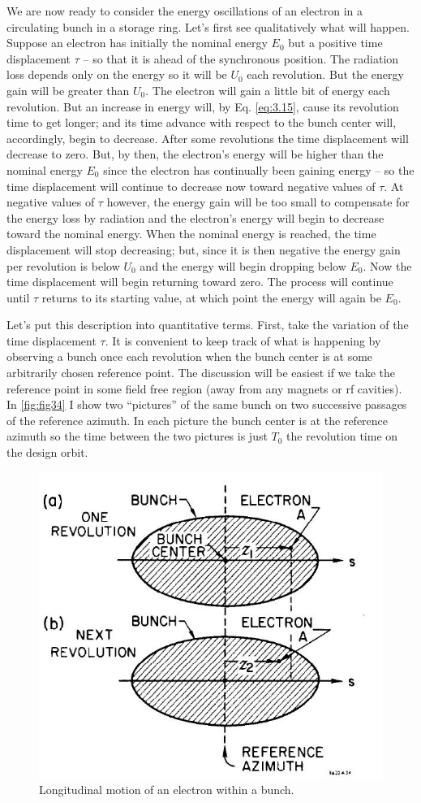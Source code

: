 We are now ready to consider the energy oscillations of an electron in a circulating bunch in a storage ring. Let's first see qualitatively what will happen. Suppose an electron has initially the nominal energy $E_0$ but a positive time displacement $\tau$ -- so that it is ahead of the synchronous position. The radiation loss depends only on the energy so it will be $U_0$ each revolution. But the energy gain will be greater than $U_0$. The electron will gain a little bit of energy each revolution. But an increase in energy will, by Eq. \eqref{eq:3.15}, cause its revolution time to get longer; and its time advance with respect to the bunch center will, accordingly, begin to decrease. After some revolutions the time displacement will decrease to zero. But, by then, the electron's energy will be higher than the nominal energy $E_0$ since the electron has continually been gaining energy -- so the time displacement will continue to decrease now toward negative values of $\tau$. At negative values of $\tau$ however, the energy gain will be too small to compensate for the energy loss by radiation and the electron's energy will begin to decrease toward the nominal energy. When the nominal energy is reached, the time displacement will stop decreasing; but, since it is then negative the energy gain per revolution is below $U_0$ and the energy will begin dropping below $E_0$. Now the time displacement will begin returning toward zero. The process will continue until $\tau$ returns to its starting value, at which point the energy will again be $E_0$.

Let's put this description into quantitative terms. First, take the variation of the time displacement $\tau$. It is convenient to keep track of what is happening by observing a bunch once each revolution when the bunch center is at some arbitrarily chosen reference point. The discussion will be easiest if we take the reference point in some field free region (away from any magnets or rf cavities). In \autoref{fig:fig34} I show two “pictures” of the same bunch on two successive passages of the reference azimuth. In each picture the bunch center is at the reference azimuth so the time between the two pictures is just $T_0$ the revolution time on the design orbit.

\begin{figure}[!htb]
	\centering
	\includegraphics[width=0.6\linewidth]{./Figuras/fig34.jpeg}
	\caption{Longitudinal motion of an electron within a bunch.}
	\label{fig:fig34}
\end{figure}

